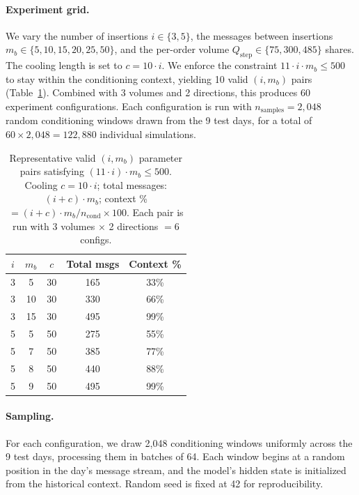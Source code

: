 \documentclass[sigplan,screen,anonymous]{acmart}
\begin{document}
\paragraph{Experiment grid.} We vary the number of insertions $i \in \{3, 5\}$, the messages between insertions $m_b \in \{5, 10, 15, 20, 25, 50\}$, and the per-order volume $Q_{\text{step}} \in \{75, 300, 485\}$ shares. The cooling length is set to $c = 10 \cdot i$. We enforce the constraint $11 \cdot i \cdot m_b \leq 500$ to stay within the conditioning context, yielding 10 valid $(i, m_b)$ pairs (Table~\ref{tab:grid}). Combined with 3 volumes and 2 directions, this produces 60 experiment configurations. Each configuration is run with $n_{\text{samples}} = 2{,}048$ random conditioning windows drawn from the 9 test days, for a total of $60 \times 2{,}048 = 122{,}880$ individual simulations.

\begin{table}[t]
  \caption{Representative valid $(i, m_b)$ parameter pairs satisfying $(11 \cdot i) \cdot m_b \leq 500$. Cooling $c = 10 \cdot i$; total messages: $(i+c) \cdot m_b$; context \% $= (i+c) \cdot m_b / n_{\text{cond}} \times 100$. Each pair is run with 3 volumes $\times$ 2 directions $= 6$ configs.}
  \label{tab:grid}
  \centering
  \small
  \begin{tabular}{@{}ccccc@{}}
    \toprule
    $i$ & $m_b$ & $c$ & Total msgs & Context \% \\
    \midrule
    3 & 5  & 30 & 165 & 33\% \\
    3 & 10 & 30 & 330 & 66\% \\
    3 & 15 & 30 & 495 & 99\% \\
    5 & 5  & 50 & 275 & 55\% \\
    5 & 7  & 50 & 385 & 77\% \\
    5 & 8  & 50 & 440 & 88\% \\
    5 & 9  & 50 & 495 & 99\% \\
    \bottomrule
  \end{tabular}
\end{table}

\paragraph{Sampling.} For each configuration, we draw 2{,}048 conditioning windows uniformly across the 9 test days, processing them in batches of 64. Each window begins at a random position in the day's message stream, and the model's hidden state is initialized from the historical context. Random seed is fixed at 42 for reproducibility.
\end{document}
